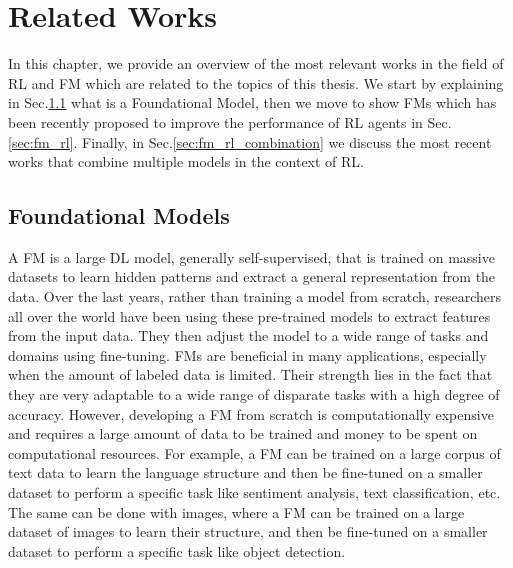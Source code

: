 
\chapter{Related Works}
\label{ch:related_work}
In this chapter, we provide an overview of the most relevant works in the field of RL and FM which are related to the topics of this thesis\@.
We start by explaining in Sec.\ref{sec:fm} what is a Foundational Model, then we move to show FMs which has been recently proposed to improve the performance of RL agents in Sec.\ref{sec:fm_rl}.
Finally, in Sec.\ref{sec:fm_rl_combination} we discuss the most recent works that combine multiple models in the context of RL\@.

\section{Foundational Models}\label{sec:fm}



A FM is a large DL model, generally self-supervised, that is trained on massive datasets to learn hidden patterns and extract a general representation from the data.
Over the last years, rather than training a model from scratch, researchers all over the world have been using these pre-trained models to extract features from the input data.
They then adjust the model to a wide range of tasks and domains using fine-tuning.
FMs are beneficial in many applications, especially when the amount of labeled data is limited.
Their strength lies in the fact that they are very adaptable to a wide range of disparate tasks with a high degree of accuracy.
However, developing a FM from scratch is computationally expensive and requires a large amount of data to be trained and money to be spent on computational resources.
For example, a FM can be trained on a large corpus of text data to learn the language structure and then be fine-tuned on a smaller dataset to perform a specific task like sentiment analysis, text classification, etc.
The same can be done with images, where a FM can be trained on a large dataset of images to learn their structure, and then be fine-tuned on a smaller dataset to perform a specific task like object detection.

